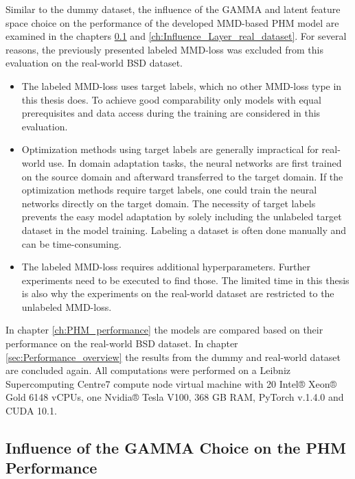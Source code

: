 Similar to the dummy dataset, the influence of the GAMMA and latent feature space choice on the performance of the developed MMD-based PHM model are examined in the chapters \ref{ch:Influence_GAMMA_real_dataset} and \ref{ch:Influence_Layer_real_dataset}. For several reasons, the previously presented labeled MMD-loss was excluded from this evaluation on the real-world BSD dataset. 
\begin{itemize}
    \item The labeled MMD-loss uses target labels, which no other MMD-loss type in this thesis does. To achieve good comparability only models with equal prerequisites and data access during the training are considered in this evaluation.
    \item Optimization methods using target labels are generally impractical for real-world use. In domain adaptation tasks, the neural networks are first trained on the source domain and afterward transferred to the target domain. If the optimization methods require target labels, one could train the neural networks directly on the target domain. The necessity of target labels prevents the easy model adaptation by solely including the unlabeled target dataset in the model training. Labeling a dataset is often done manually and can be time-consuming.
    \item The labeled MMD-loss requires additional hyperparameters. Further experiments need to be executed to find those. The limited time in this thesis is also why the experiments on the real-world dataset are restricted to the unlabeled MMD-loss. 
\end{itemize}

In chapter \ref{ch:PHM_performance} the models are compared based on their performance on the real-world BSD dataset. In chapter \ref{sec:Performance_overview} the results from the dummy and real-world dataset are concluded again. All computations were performed on a Leibniz Supercomputing Centre7 compute node virtual machine with 20 Intel® Xeon® Gold 6148 vCPUs, one Nvidia® Tesla V100, 368 GB RAM, PyTorch v.1.4.0 and CUDA 10.1.


\subsection{Influence of the GAMMA Choice on the PHM Performance}\label{ch:Influence_GAMMA_real_dataset}

